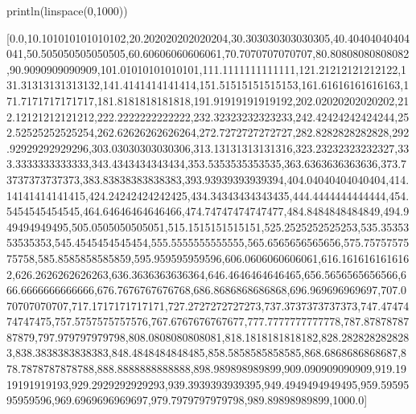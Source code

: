 \begin{juliacode}
println(linspace(0,1000))
\end{juliacode}
\begin{juliaout}

[0.0,10.101010101010102,20.202020202020204,30.303030303030305,40.40404040404041,50.505050505050505,60.60606060606061,70.7070707070707,80.80808080808082,90.9090909090909,101.01010101010101,111.1111111111111,121.21212121212122,131.31313131313132,141.4141414141414,151.51515151515153,161.61616161616163,171.7171717171717,181.8181818181818,191.91919191919192,202.02020202020202,212.12121212121212,222.2222222222222,232.32323232323233,242.42424242424244,252.52525252525254,262.62626262626264,272.7272727272727,282.8282828282828,292.92929292929296,303.03030303030306,313.13131313131316,323.23232323232327,333.3333333333333,343.4343434343434,353.5353535353535,363.6363636363636,373.73737373737373,383.83838383838383,393.93939393939394,404.04040404040404,414.14141414141415,424.24242424242425,434.34343434343435,444.4444444444444,454.5454545454545,464.64646464646466,474.74747474747477,484.8484848484849,494.949494949495,505.0505050505051,515.1515151515151,525.2525252525253,535.3535353535353,545.4545454545454,555.5555555555555,565.6565656565656,575.7575757575758,585.8585858585859,595.959595959596,606.0606060606061,616.1616161616162,626.2626262626263,636.3636363636364,646.4646464646465,656.5656565656566,666.6666666666666,676.7676767676768,686.8686868686868,696.969696969697,707.070707070707,717.1717171717171,727.2727272727273,737.3737373737373,747.4747474747475,757.5757575757576,767.6767676767677,777.7777777777778,787.8787878787879,797.979797979798,808.0808080808081,818.1818181818182,828.2828282828283,838.3838383838383,848.4848484848485,858.5858585858585,868.6868686868687,878.7878787878788,888.8888888888888,898.989898989899,909.090909090909,919.1919191919193,929.2929292929293,939.3939393939395,949.4949494949495,959.5959595959596,969.6969696969697,979.7979797979798,989.89898989899,1000.0]

\end{juliaout}




